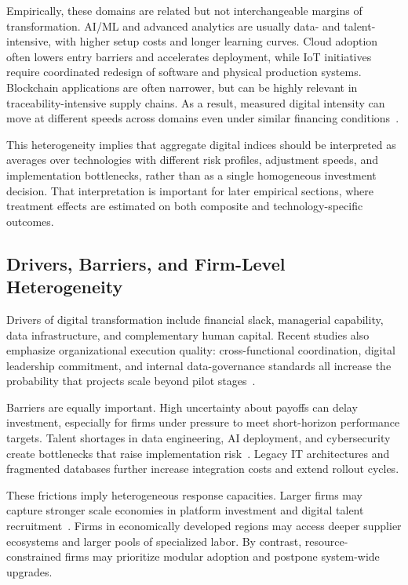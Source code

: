 Empirically, these domains are related but not interchangeable margins of transformation. AI/ML and advanced analytics are usually data- and talent-intensive, with higher setup costs and longer learning curves. Cloud adoption often lowers entry barriers and accelerates deployment, while IoT initiatives require coordinated redesign of software and physical production systems. Blockchain applications are often narrower, but can be highly relevant in traceability-intensive supply chains. As a result, measured digital intensity can move at different speeds across domains even under similar financing conditions~\cite{Wang2024,Ren2024}.

This heterogeneity implies that aggregate digital indices should be interpreted as averages over technologies with different risk profiles, adjustment speeds, and implementation bottlenecks, rather than as a single homogeneous investment decision. That interpretation is important for later empirical sections, where treatment effects are estimated on both composite and technology-specific outcomes.

\subsection{Drivers, Barriers, and Firm-Level Heterogeneity}

Drivers of digital transformation include financial slack, managerial capability, data infrastructure, and complementary human capital. Recent studies also emphasize organizational execution quality: cross-functional coordination, digital leadership commitment, and internal data-governance standards all increase the probability that projects scale beyond pilot stages~\cite{ZhangCao2023}.

Barriers are equally important. High uncertainty about payoffs can delay investment, especially for firms under pressure to meet short-horizon performance targets. Talent shortages in data engineering, AI deployment, and cybersecurity create bottlenecks that raise implementation risk~\cite{ZhangCao2023}. Legacy IT architectures and fragmented databases further increase integration costs and extend rollout cycles.

These frictions imply heterogeneous response capacities. Larger firms may capture stronger scale economies in platform investment and digital talent recruitment~\cite{Gao2024}. Firms in economically developed regions may access deeper supplier ecosystems and larger pools of specialized labor. By contrast, resource-constrained firms may prioritize modular adoption and postpone system-wide upgrades.

